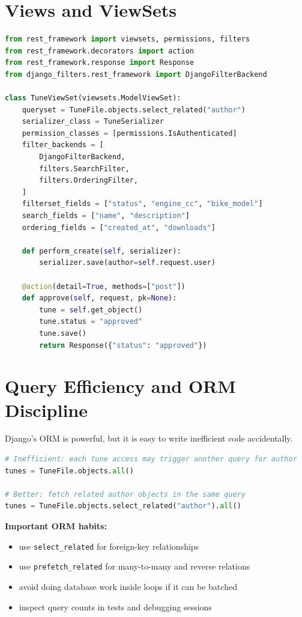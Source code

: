 \documentclass[12pt, a4paper, oneside]{book}
\begin{document}
\section{Views and ViewSets}

\begin{lstlisting}[language=Python, caption={DRF views}]
from rest_framework import viewsets, permissions, filters
from rest_framework.decorators import action
from rest_framework.response import Response
from django_filters.rest_framework import DjangoFilterBackend

class TuneViewSet(viewsets.ModelViewSet):
    queryset = TuneFile.objects.select_related("author")
    serializer_class = TuneSerializer
    permission_classes = [permissions.IsAuthenticated]
    filter_backends = [
        DjangoFilterBackend,
        filters.SearchFilter,
        filters.OrderingFilter,
    ]
    filterset_fields = ["status", "engine_cc", "bike_model"]
    search_fields = ["name", "description"]
    ordering_fields = ["created_at", "downloads"]

    def perform_create(self, serializer):
        serializer.save(author=self.request.user)

    @action(detail=True, methods=["post"])
    def approve(self, request, pk=None):
        tune = self.get_object()
        tune.status = "approved"
        tune.save()
        return Response({"status": "approved"})
\end{lstlisting}

\section{Query Efficiency and ORM Discipline}

Django's ORM is powerful, but it is easy to write inefficient code accidentally.

\begin{lstlisting}[language=Python, caption={Avoiding N+1 queries}]
# Inefficient: each tune access may trigger another query for author
tunes = TuneFile.objects.all()

# Better: fetch related author objects in the same query
tunes = TuneFile.objects.select_related("author").all()
\end{lstlisting}

\textbf{Important ORM habits:}
\begin{itemize}[leftmargin=2em]
    \item use \texttt{select\_related} for foreign-key relationships
    \item use \texttt{prefetch\_related} for many-to-many and reverse relations
    \item avoid doing database work inside loops if it can be batched
    \item inspect query counts in tests and debugging sessions
\end{itemize}
\end{document}
